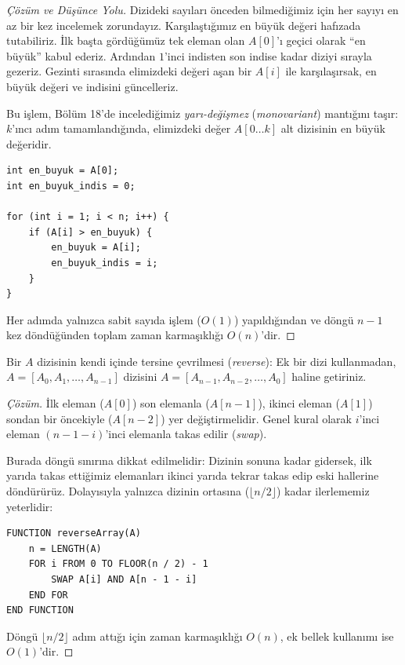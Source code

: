 \begin{proof}[Çözüm ve Düşünce Yolu]
Dizideki sayıları önceden bilmediğimiz için her sayıyı en az bir kez incelemek zorundayız. Karşılaştığımız en büyük değeri hafızada tutabiliriz. İlk başta gördüğümüz tek eleman olan $A[0]$'ı geçici olarak ``en büyük'' kabul ederiz. Ardından $1$'inci indisten son indise kadar diziyi sırayla gezeriz. Gezinti sırasında elimizdeki değeri aşan bir $A[i]$ ile karşılaşırsak, en büyük değeri ve indisini güncelleriz.

Bu işlem, Bölüm 18'de incelediğimiz \emph{yarı-değişmez} (\emph{monovariant}) mantığını taşır: $k$'ıncı adım tamamlandığında, elimizdeki değer $A[0 \dots k]$ alt dizisinin en büyük değeridir.

\begin{lstlisting}[language=CTemel]
int en_buyuk = A[0];
int en_buyuk_indis = 0;

for (int i = 1; i < n; i++) {
    if (A[i] > en_buyuk) {
        en_buyuk = A[i];
        en_buyuk_indis = i;
    }
}
\end{lstlisting}
Her adımda yalnızca sabit sayıda işlem ($O(1)$) yapıldığından ve döngü $n-1$ kez döndüğünden toplam zaman karmaşıklığı $O(n)$'dir.
\end{proof}

\begin{example}
Bir $A$ dizisinin kendi içinde tersine çevrilmesi (\emph{reverse}): Ek bir dizi kullanmadan, $A = [A_0, A_1, \dots, A_{n-1}]$ dizisini $A = [A_{n-1}, A_{n-2}, \dots, A_0]$ haline getiriniz.
\end{example}

\begin{proof}[Çözüm]
İlk eleman ($A[0]$) son elemanla ($A[n-1]$), ikinci eleman ($A[1]$) sondan bir öncekiyle ($A[n-2]$) yer değiştirmelidir. Genel kural olarak $i$'inci eleman $(n-1-i)$'inci elemanla takas edilir (\emph{swap}). 

Burada döngü sınırına dikkat edilmelidir: Dizinin sonuna kadar gidersek, ilk yarıda takas ettiğimiz elemanları ikinci yarıda tekrar takas edip eski hallerine döndürürüz. Dolayısıyla yalnızca dizinin ortasına ($\lfloor n/2 \rfloor$) kadar ilerlememiz yeterlidir:

\begin{lstlisting}
FUNCTION reverseArray(A)
    n = LENGTH(A)
    FOR i FROM 0 TO FLOOR(n / 2) - 1
        SWAP A[i] AND A[n - 1 - i]
    END FOR
END FUNCTION\end{lstlisting}
Döngü $\lfloor n/2 \rfloor$ adım attığı için zaman karmaşıklığı $O(n)$, ek bellek kullanımı ise $O(1)$'dir.
\end{proof}

